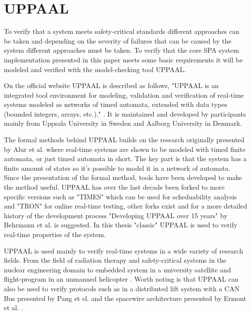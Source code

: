 
\section{UPPAAL}
To verify that a system meets safety-critical standards different approaches
can be taken and depending on the severity of failures that can be caused by
the system different approaches must be taken. To verify that the core SPA
system implementation presented in this paper meets some basic requirements it
will be modeled and verified with the model-checking tool UPPAAL.

On the official website UPPAAL is described as follows, "UPPAAL is an
integrated tool environment for modeling, validation and verification of
real-time systems modeled as networks of timed automata, extended with data
types (bounded integers, arrays, etc.)." \cite{web:uppaal}. It is maintained
and developed by participants mainly from Uppsala University in Sweden and
Aalborg University in Denmark.

The formal methods behind UPPAAL builds on the research originally presented
by Alur et al. \cite{alur1994} where real-time systems are shown to be modeled
with timed finite automata, or just timed automata in short. The key part is
that the system has a finite amount of states so it's possible to model it in a
network of automata. Since the presentation of the formal method, tools have
been developed to make the method useful. UPPAAL has over the last decade been
forked to more specific versions such as "TIMES" which can be used for
scheduability analysis and "TRON" for online real-time testing, other forks
exist and for a more detailed history of the development process "Developing
UPPAAL over 15 years" by Behrmann et al.  \cite{behrmann2011} is suggested. In
this thesis "classic" UPPAAL is used to verify real-time properties of the
system.

UPPAAL is used mainly to verify real-time systems in a wide variety of research
fields. From the field of radiation therapy \cite{man2011} and safety-critical
systems in the nuclear engineering domain \cite{lahtinen2012} to embedded
system in a university satellite \cite{alencar2013} and flight-program in an
unmanned helicopter \cite{lee2011}. Worth noting is that UPPAAL can also be used
to verify protocols such as in a distributed lift system with a CAN Bus
presented by Pang et el. \cite{pang2003} and the spacewire architecture
presented by Ermont et al. \cite{ermont2013}.

